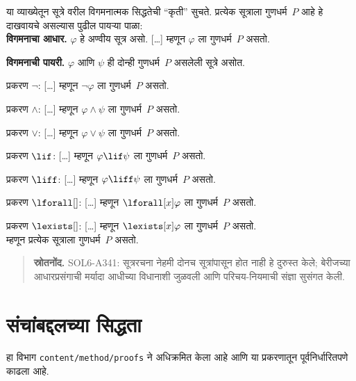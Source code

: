 \begin{explain}
या व्याख्येतून सूत्रे वरील विगमनात्मक सिद्धतेची
“कृती” सुचते. प्रत्येक सूत्राला गुणधर्म~$P$
आहे हे दाखवायचे असल्यास पुढील पायऱ्या पाळा:\\

\textbf{विगमनाचा आधार.} $\varphi$ हे अण्वीय
सूत्र असो. [\ldots] म्हणून $\varphi$ ला गुणधर्म~$P$ असतो.

\textbf{विगमनाची पायरी.} $\varphi$ आणि $\psi$ ही दोन्ही
गुणधर्म~$P$ असलेली सूत्रे असोत.

प्रकरण $\lnot$: [\ldots] म्हणून $\lnot \varphi$ ला गुणधर्म~$P$ असतो.

प्रकरण $\land$: [\ldots] म्हणून $\varphi \land \psi$ ला गुणधर्म~$P$ असतो.

प्रकरण $\lor$: [\ldots] म्हणून $\varphi \lor \psi$ ला गुणधर्म~$P$ असतो.

प्रकरण $\lif$: [\ldots] म्हणून $\varphi \lif \psi$ ला गुणधर्म~$P$ असतो.

प्रकरण $\liff$: [\ldots] म्हणून $\varphi \liff \psi$ ला गुणधर्म~$P$ असतो.

प्रकरण $\lforall[]$: [\ldots] म्हणून $\lforall[x] \varphi$ ला गुणधर्म~$P$ असतो.

प्रकरण $\lexists[]$: [\ldots] म्हणून $\lexists[x] \varphi$ ला गुणधर्म~$P$ असतो. \\

म्हणून प्रत्येक सूत्राला गुणधर्म~$P$ असतो.
\end{explain}



\begin{quote}\small\textbf{स्रोतनोंद.} SOL6-A341: सूत्ररचना नेहमी दोनच सूत्रांपासून होत नाही हे दुरुस्त केले; बेरीजच्या आधारप्रसंगाची मर्यादा आधीच्या विधानाशी जुळवली आणि परिचय-नियमाची संज्ञा सुसंगत केली.\end{quote}










\section{संचांबद्दलच्या सिद्धता}\label{sfr:set:prf:sec}

\begin{editorial}
हा विभाग \verb|content/method/proofs| ने अधिक्रमित केला आहे आणि
या प्रकरणातून पूर्वनिर्धारितपणे काढला आहे.
\end{editorial}

